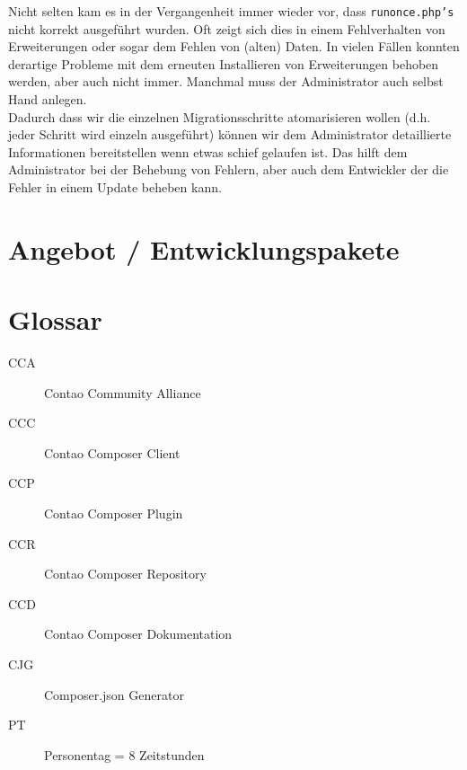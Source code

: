 \documentclass[
paper=a4,
draft=false,%
fontsize=10pt%
]{scrartcl}
\begin{document}
Nicht selten kam es in der Vergangenheit immer wieder vor, dass \texttt{runonce.php's} nicht korrekt ausgeführt wurden. Oft zeigt sich dies in einem Fehlverhalten von Erweiterungen oder sogar dem Fehlen von (alten) Daten. In vielen Fällen konnten derartige Probleme mit dem erneuten Installieren von Erweiterungen behoben werden, aber auch nicht immer. Manchmal muss der Administrator auch selbst Hand anlegen.\\
Dadurch dass wir die einzelnen Migrationsschritte atomarisieren wollen (d.h. jeder Schritt wird einzeln ausgeführt) können wir dem Administrator detaillierte Informationen bereitstellen wenn etwas schief gelaufen ist. Das hilft dem Administrator bei der Behebung von Fehlern, aber auch dem Entwickler der die Fehler in einem Update beheben kann.

%
%

\newpage

\section{Angebot / Entwicklungspakete}
\label{sec:offer}

%
%

\newpage

\section{Glossar}

\begin{description}
\item[CCA] Contao Community Alliance \\
\item[CCC] Contao Composer Client \\
\item[CCP] Contao Composer Plugin \\
\item[CCR] Contao Composer Repository \\
\item[CCD] Contao Composer Dokumentation \\
\item[CJG] Composer.json Generator \\
\item[PT] Personentag = 8 Zeitstunden
\end{description}
\end{document}
